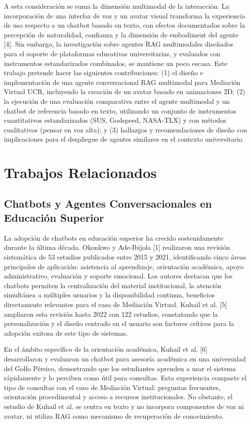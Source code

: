 \documentclass[conference]{IEEEtran}
\begin{document}
A esta consideración se suma la dimensión multimodal de la interacción. La incorporación de una interfaz de voz y un avatar visual transforma la experiencia de uso respecto a un chatbot basado en texto, con efectos documentados sobre la percepción de naturalidad, confianza y la dimensión de embodiment del agente [4]. Sin embargo, la investigación sobre agentes RAG multimodales diseñados para el soporte de plataformas educativas universitarias, y evaluados con instrumentos estandarizados combinados, se mantiene un poco escasa.
Este trabajo pretende hacer las siguientes contribuciones: (1) el diseño e implementación de una agente conversacional RAG multimodal para Mediación Virtual UCR, incluyendo la creación de un avatar basado en animaciones 2D; (2) la ejecución de una evaluación comparativa entre el agente multimodal y un chatbot de referencia basado en texto, utilizando un conjunto de instrumentos cuantitativos estandarizados (SUS, Godspeed, NASA-TLX) y con métodos cualitativos (pensar en voz alta); y (3) hallazgos y recomendaciones de diseño con implicaciones para el despliegue de agentes similares en el contexto universitario.


\section{Trabajos Relacionados}

\subsection{Chatbots y Agentes Conversacionales en Educación Superior}
La adopción de chatbots en educación superior ha crecido sostenidamente durante la última década. Okonkwo y Ade-Ibijola [1] realizaron una revisión sistemática de 53 estudios publicados entre 2015 y 2021, identificando cinco áreas principales de aplicación: asistencia al aprendizaje, orientación académica, apoyo administrativo, evaluación y soporte emocional. Los autores destacan que los chatbots permiten la centralización del material institucional, la atención simultánea a múltiples usuarios y la disponibilidad continua, beneficios directamente relevantes para el caso de Mediación Virtual. Kuhail et al. [5] ampliaron esta revisión hasta 2022 con 122 estudios, constatando que la personalización y el diseño centrado en el usuario son factores críticos para la adopción exitosa de este tipo de sistemas.

En el ámbito específico de la orientación académica, Kuhail et al. [6] desarrollaron y evaluaron un chatbot para asesoría académica en una universidad del Golfo Pérsico, demostrando que los estudiantes aprenden a usar el sistema rápidamente y lo perciben como útil para consultas. Esta experiencia comparte el tipo de consultas con el caso de Mediación Virtual: preguntas frecuentes, orientación procedimental y acceso a recursos institucionales. No obstante, el estudio de Kuhail et al. se centra en texto y no incorpora componentes de voz ni avatar, ni utiliza RAG como mecanismo de recuperación de conocimiento.
\end{document}

